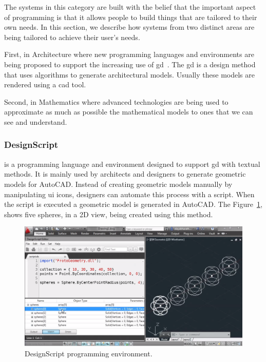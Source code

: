 The systems in this category are built with the belief that the important aspect of programming is that it allows people to build things that are tailored to their own needs. In this section, we describe how systems from two distinct areas are being tailored to achieve their user's needs. 

First, in Architecture where new programming languages and environments are being proposed to support the increasing use of \ac{gd}~\cite{mccormack2004generative}. The \ac{gd} is a design method that uses algorithms to generate architectural models. Usually these models are rendered using a \ac{cad} tool. 

Second, in Mathematics where advanced technologies are being used to approximate as much as possible the mathematical models to ones that we can see and understand.

\subsubsection{DesignScript~\cite{aish2012designscript}} is a programming language and environment designed to support \ac{gd} with textual methods. It is mainly used by architects and designers to generate geometric models for AutoCAD. Instead of creating geometric models manually by manipulating \ac{ui} icons, designers can automate this process with a script. When the script is executed a geometric model is generated in AutoCAD. The Figure~\ref{fig:ds}, shows five spheres, in a 2D view, being created using this method.

\begin{figure}[!htbp]
\vspace{-5pt}
  \centering
  \includegraphics[width=1.0\textwidth]{img/designScriptIDE}
  \vspace{-20pt}
    \caption{DesignScript programming environment.} 
    \vspace{-10pt} 
  \label{fig:ds}
\end{figure} 


